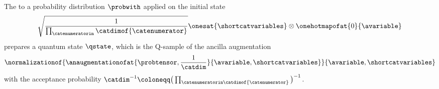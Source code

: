 \begin{lemma}
    \label{lem:actCircuitAncilla}
    The \activationCircuit{} to a probability distribution $\probwith$ applied on the initial state
    \begin{align*}
        \sqrt{\frac{1}{\prod_{\catenumeratorin}\catdimof{\catenumerator}}}\onesat{\shortcatvariables} \otimes \onehotmapofat{0}{\avariable}
    \end{align*}
    prepares a quantum state $\qstate$, which is the Q-sample of the ancilla augmentation
    \begin{align*}
        \normalizationof{\anaugmentationofat{\probtensor,\frac{1}{\catdim}}{\avariable,\shortcatvariables}}{\avariable,\shortcatvariables}
    \end{align*}
    with the acceptance probability $\catdim^{-1}\coloneqq \big(\prod_{\catenumeratorin\catdimof{\catenumerator}}\big)^{-1}$.
\end{lemma}
